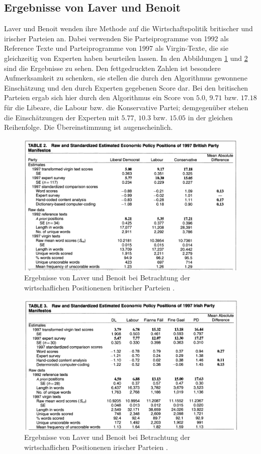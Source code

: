  
\subsection{Ergebnisse von Laver und Benoit} \label{LuBErgebnisse}
Laver und Benoit \cite{LuB} wenden ihre Methode auf die Wirtschaftspolitik britischer und irischer Parteien an. Dabei verwenden Sie Parteiprogramme von 1992 als Reference Texte und Parteiprogramme von 1997 als Virgin-Texte, die sie gleichzeitig von Experten haben beurteilen lassen. In den Abbildungen \ref{fig:Tab2} und \ref{fig:Tab3} sind die Ergebnisse zu sehen. Den fettgedruckten Zahlen ist besondere Aufmerksamkeit zu schenken, sie stellen die durch den Algorithmus gewonnene Einschätzung und den durch Experten gegebenen Score dar. Bei den britischen Parteien ergab sich hier durch den Algorithmus ein Score von $5.0$, $9.71$ bzw. $17.18$ für die Libeare, die Labour bzw. die Konservative Partei; demgegenüber stehen die Einschätzungen der Experten mit $5.77$, $10.3$ bzw. $15.05$ in der gleichen Reihenfolge. Die Übereinstimmung ist augenscheinlich.

\begin{figure}
   \includegraphics[width=\textwidth]{images/Tab2_LuB.png}
   \caption{Ergebnisse von Laver und Benoit bei Betrachtung der wirtschaflichen Positionenen britischer Parteien \cite{LuB}.\label{fig:Tab2}}
\end{figure}
\begin{figure}
   \includegraphics[width=\textwidth]{images/Tab3_LuB.png}
   \caption{Ergebnisse von Laver und Benoit bei Betrachtung der wirtschaflichen Positionenen irischer Parteien \cite{LuB}. \label{fig:Tab3}}
\end{figure}

